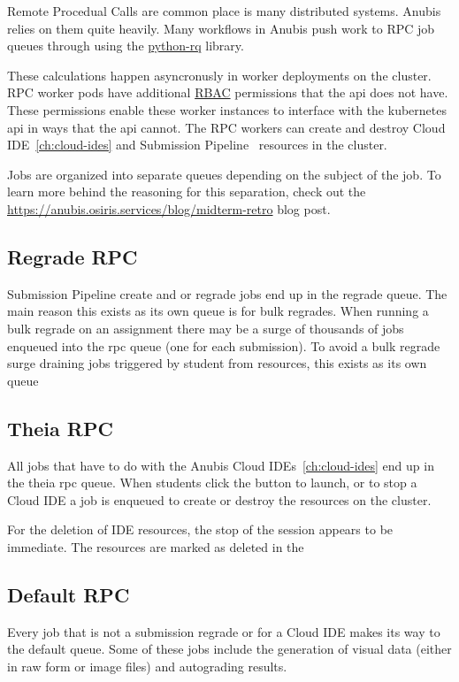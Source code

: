 Remote Procedual Calls are common place is many distributed systems.
Anubis relies on them quite heavily.
Many workflows in Anubis push work to RPC job queues through using the
\href{https://python-rq.org}{python-rq} library.

These calculations happen asyncronusly in worker deployments on the cluster.
RPC worker pods have additional \href{https://kubernetes.io/docs/reference/access-authn-authz/rbac/}{RBAC}
permissions that the api does not have.
These permissions enable these worker instances to interface with the kubernetes api in ways
that the api cannot.
The RPC workers can create and destroy Cloud IDE~\ref{ch:cloud-ides}
and Submission Pipeline~ resources in the cluster.

Jobs are organized into separate queues depending on the subject of the job.
To learn more behind the reasoning for this separation, check out the
\href{Spring 2021 Midterm Retro}{https://anubis.osiris.services/blog/midterm-retro}
blog post.

\subsection{Regrade RPC}\label{subsec:regrade-rpc}

Submission Pipeline create and or regrade jobs end up in the regrade queue.
The main reason this exists as its own queue is for bulk regrades.
When running a bulk regrade on an assignment there may be a surge of thousands of
jobs enqueued into the rpc queue (one for each submission).
To avoid a bulk regrade surge draining jobs triggered by student from resources,
this exists as its own queue

\subsection{Theia RPC}\label{subsec:theia-rpc}

All jobs that have to do with the Anubis Cloud IDEs~\ref{ch:cloud-ides} end up in the theia rpc queue.
When students click the button to launch, or to stop a Cloud IDE a job is enqueued to create or destroy 
the resources on the cluster.

For the deletion of IDE resources, the stop of the session appears to be immediate.
The resources are marked as deleted in the 

\subsection{Default RPC}\label{subsec:default-rpc}

Every job that is not a submission regrade or for a Cloud IDE makes its way to the default queue.
Some of these jobs include the generation of visual data (either in raw form or image files) and
autograding results.